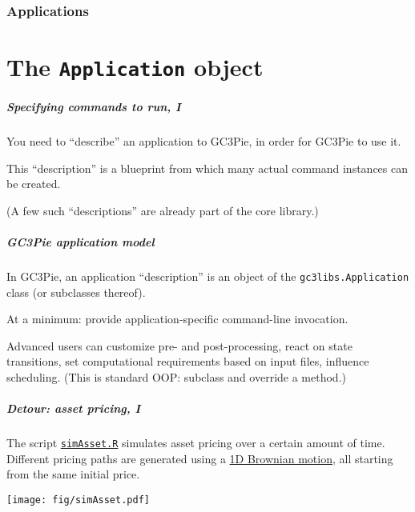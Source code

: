 \documentclass[english,serif,mathserif,xcolor=pdftex,dvipsnames,table]{beamer}
\begin{document}
\section{Applications}
\part{The \texttt{Application} object}

\begin{frame}
  \frametitle{Specifying commands to run, I}

  You need to ``describe'' an application to GC3Pie, in order for
  GC3Pie to use it.

  \+
  This ``description'' is a blueprint from which many actual
  command instances can be created.

  \+
  (A few such ``descriptions'' are already part of the core library.)
\end{frame}


\begin{frame}
  \frametitle{GC3Pie application model}

  In GC3Pie, an application ``description'' is an object of the
  \texttt{gc3libs.Application} class (or subclasses thereof).

  \+
  At a minimum: provide application-specific command-line invocation.

  \+
  Advanced users can customize pre- and post-processing, react on
  state transitions, set computational requirements based on input
  files, influence scheduling.  (This is standard OOP: subclass and
  override a method.)
\end{frame}


\begin{frame}
  \frametitle{Detour: asset pricing, I}
  \small The script
  \href{https://raw.githubusercontent.com/riccardomurri/python-for-science-intro/master/download/simAsset.R}{\texttt{simAsset.R}}
  simulates asset pricing over a certain amount of time. Different pricing paths
  are generated using a \href{https://en.wikipedia.org/wiki/Wiener_process}{1D
    Brownian motion}, all starting from the same initial price.
  \begin{center}
    \texttt{[image: fig/simAsset.pdf]}
  \end{center}
\end{frame}
\end{document}
